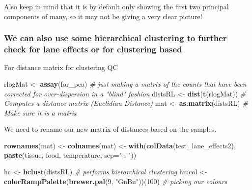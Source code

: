 \documentclass[
]{article}
\newenvironment{Shaded}{\begin{snugshade}}{\end{snugshade}}
\newcommand{\CommentTok}[1]{\textcolor[rgb]{0.56,0.35,0.01}{\textit{#1}}}
\newcommand{\DataTypeTok}[1]{\textcolor[rgb]{0.13,0.29,0.53}{#1}}
\newcommand{\DecValTok}[1]{\textcolor[rgb]{0.00,0.00,0.81}{#1}}
\newcommand{\KeywordTok}[1]{\textcolor[rgb]{0.13,0.29,0.53}{\textbf{#1}}}
\newcommand{\NormalTok}[1]{#1}
\newcommand{\StringTok}[1]{\textcolor[rgb]{0.31,0.60,0.02}{#1}}
\begin{document}
Also keep in mind that it is by default only showing the first two
principal components of many, so it may not be giving a very clear
picture!

\hypertarget{we-can-also-use-some-hierarchical-clustering-to-further-check-for-lane-effects-or-for-clustering-based}{%
\subsubsection{We can also use some hierarchical clustering to further
check for lane effects or for clustering
based}\label{we-can-also-use-some-hierarchical-clustering-to-further-check-for-lane-effects-or-for-clustering-based}}

For distance matrix for clustering QC

\begin{Shaded}
\begin{Highlighting}[]
\NormalTok{rlogMat <-}\StringTok{ }\KeywordTok{assay}\NormalTok{(for_pca) }\CommentTok{# just making a matrix of the counts that have been corrected for over-dispersion in a "blind" fashion}
\NormalTok{distsRL <-}\StringTok{ }\KeywordTok{dist}\NormalTok{(}\KeywordTok{t}\NormalTok{(rlogMat)) }\CommentTok{# Computes a distance matrix (Euclidian Distance)}
\NormalTok{mat <-}\StringTok{ }\KeywordTok{as.matrix}\NormalTok{(distsRL)  }\CommentTok{# Make sure it is a matrix}
\end{Highlighting}
\end{Shaded}

We need to rename our new matrix of distances based on the samples.

\begin{Shaded}
\begin{Highlighting}[]
\KeywordTok{rownames}\NormalTok{(mat) <-}\StringTok{ }\KeywordTok{colnames}\NormalTok{(mat) <-}\StringTok{   }\KeywordTok{with}\NormalTok{(}\KeywordTok{colData}\NormalTok{(test_lane_effects2), }
                                         \KeywordTok{paste}\NormalTok{(tissue, food, temperature,}
                                               \DataTypeTok{sep=}\StringTok{" : "}\NormalTok{))}

\NormalTok{hc <-}\StringTok{ }\KeywordTok{hclust}\NormalTok{(distsRL)  }\CommentTok{# performs hierarchical clustering}
\NormalTok{hmcol <-}\StringTok{ }\KeywordTok{colorRampPalette}\NormalTok{(}\KeywordTok{brewer.pal}\NormalTok{(}\DecValTok{9}\NormalTok{, }\StringTok{"GnBu"}\NormalTok{))(}\DecValTok{100}\NormalTok{)  }\CommentTok{# picking our colours}
\end{Highlighting}
\end{Shaded}
\end{document}
